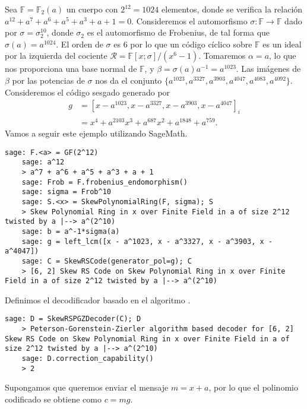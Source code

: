 \begin{example}
  Sea \(\mathbb F = \mathbb F_2(a)\) un cuerpo con \(2^{12} = 1024\) elementos, donde se verifica la relación \(a^{12} + a^7 + a^{6} + a^{5} + a^{3} + a + 1 = 0\).
  Consideremos el automorfismo \(\sigma: \mathbb F \to \mathbb F\) dado por \(\sigma = \sigma_2^{10}\), donde \(\sigma_2\) es el automorfismo de Frobenius, de tal forma que \(\sigma(a) = a^{1024}\).
  El orden de \(\sigma\) es \(6\) por lo que un código cíclico sobre \(\mathbb F\) es un ideal por la izquierda del cociente \(\mathcal R = \mathbb F[x; \sigma]/(x^{6} - 1)\).
  Tomaremos \(\alpha = a\), lo que nos proporciona una base normal de \(\mathbb F\), y \(\beta = \sigma(a)a^{-1} = a^{1023}\).
  Las imágenes de \(\beta\) por las potencias de \(\sigma\) nos da el conjunto \(\{a^{1023}, a^{3327}, a^{3903}, a^{4047}, a^{4083}, a^{4092}\}\).
  Consideremos el código  sesgado generado por
  \begin{align*}
    g &= \left[x - a^{1023}, x - a^{3327}, x - a^{3903}, x - a^{4047}\right]_i \\
      &= x^4 + a^{2103}x^3 + a^{687}x^2 + a^{1848} + a^{759}.
  \end{align*}
  Vamos a seguir este ejemplo utilizando SageMath.
  \begin{lstlisting}[gobble=4]
    sage: F.<a> = GF(2^12)
    sage: a^12
    > a^7 + a^6 + a^5 + a^3 + a + 1
    sage: Frob = F.frobenius_endomorphism()
    sage: sigma = Frob^10
    sage: S.<x> = SkewPolynomialRing(F, sigma); S
    > Skew Polynomial Ring in x over Finite Field in a of size 2^12 twisted by a |--> a^(2^10)
    sage: b = a^-1*sigma(a)
    sage: g = left_lcm([x - a^1023, x - a^3327, x - a^3903, x - a^4047])
    sage: C = SkewRSCode(generator_pol=g); C
    > [6, 2] Skew RS Code on Skew Polynomial Ring in x over Finite Field in a of size 2^12 twisted by a |--> a^(2^10)
  \end{lstlisting}
  Definimos el decodificador basado en el algoritmo .
  \begin{lstlisting}[gobble=4]
    sage: D = SkewRSPGZDecoder(C); D
    > Peterson-Gorenstein-Zierler algorithm based decoder for [6, 2] Skew RS Code on Skew Polynomial Ring in x over Finite Field in a of size 2^12 twisted by a |--> a^(2^10)
    sage: D.correction_capability()
    > 2
  \end{lstlisting}
  Supongamos que queremos enviar el mensaje \(m = x + a\), por lo que el polinomio codificado se obtiene como \(c = mg\).
  \begin{lstlisting}[gobble=4]

\end{lstlisting}
\end{example}
